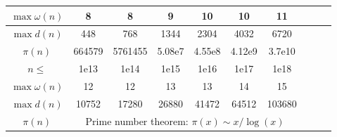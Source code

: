 \begin{table}[H]
\begin{tabular}{|c|c|c|c|c|c|c|c|c|c|}
			$\max\omega(n)$ & 8 & 8 & 9 & 10& 10 & 11 \\
			\hline
			$\max{d(n)}$ & 448 & 768 & 1344 & 2304 & 4032 & 6720 \\
			\hline
			$\pi(n)$ & 664579 & 5761455 & 5.08e7 & 4.55e8 & 4.12e9 & 3.7e10 \\
			\hline
			\rowcolor{black!10} $n \leq$ & 1e13& 1e14& 1e15& 1e16& 1e17& 1e18 \\
			\hline
			$\max\omega(n)$ & 12 & 12 & 13 & 13 & 14 & 15 \\
			\hline
			$\max{d(n)}$ & 10752 & 17280 & 26880 & 41472 & 64512 & 103680\\
			\hline
			$\pi(n)$ & \multicolumn{6}{c|}{Prime number theorem: $\pi(x) \sim x / \log (x)$} \\
			\hline
			\end{tabular}
\begin{comment}
		\begin{tabular}{|r|r|r|r|}
			\hline
			n  & LCM(1...n)  & Pn  & Bn \\
			\hline
			2  & 2  & 2  & 2 \\
			\hline
			3  & 6  & 3  & 5 \\
			\hline
			4  & 12  & 5  & 15 \\
			\hline
			5  & 60  & 7  & 52 \\
			\hline
			6  & 60  & 11  & 203 \\
			\hline
			7  & 420  & 15  & 877 \\
			\hline
			8  & 840  & 22  & 4140 \\
			\hline
			9  & 2520  & 30  & 21147 \\
			\hline
			10  & 2520  & 42  & 115975 \\
			\hline
			11  & 27720  & 56  & 678570 \\
			\hline
			12  & 27720  & 77  & 4213597 \\
			\hline
			15  & 360360  & 176  & 1382958545 \\
			\hline
			20  & 232792560  & 627  &  \\
			\hline
			25  &   & 1958  &  \\
			\hline
			30  &   & 5604  &  \\
			\hline
			40  &   & 37338  &  \\
			\hline
			50  &   & 204226  &  \\
			\hline
			70  &   & 4087968  &  \\
			\hline
			100  &   & 190569292  &  \\
			\hline
		\end{tabular}
\end{comment}
	\end{table}